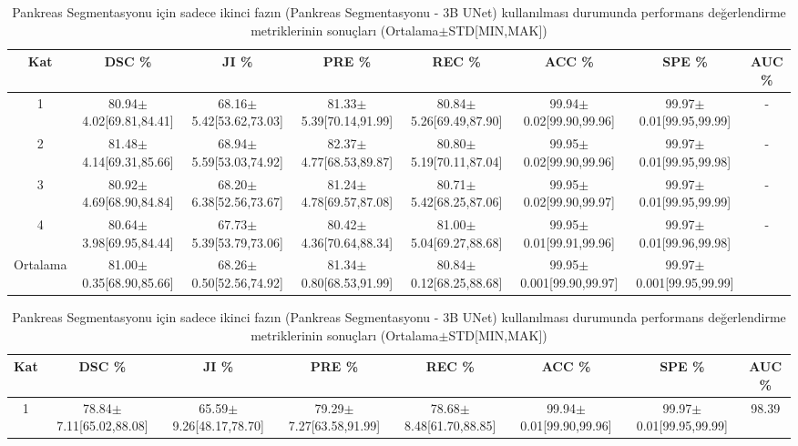 \begin{table}
	\centering
	\caption{Pankreas Segmentasyonu için sadece birinci fazın (Pankreas İlgi Bölgesinin Belirlenmesi - Mask R-CNN) kullanılması durumunda performans değerlendirme metriklerinin sonuçları (Ortalama$\pm$STD[MIN,MAK])}
	\label{tab:mrcnn_result}
	\begin{adjustbox}{width=\textwidth}		
		\begin{tabular}{cccccccc}
			\toprule
			Kat   &  DSC \%       &  JI  \%   &  PRE  \%   &  REC  \%  & ACC  \%  &  SPE  \% &  AUC  \% \\ 
			\midrule 
			1       & 80.94$\pm$4.02[69.81,84.41] & 68.16$\pm$5.42[53.62,73.03] & 81.33$\pm$5.39[70.14,91.99] & 80.84$\pm$5.26[69.49,87.90] & 99.94$\pm$0.02[99.90,99.96]  & 99.97$\pm$0.01[99.95,99.99]  &  - \\
			2       & 81.48$\pm$4.14[69.31,85.66] & 68.94$\pm$5.59[53.03,74.92] & 82.37$\pm$4.77[68.53,89.87] & 80.80$\pm$5.19[70.11,87.04] & 99.95$\pm$0.02[99.90,99.96]  & 99.97$\pm$0.01[99.95,99.98]  &  - \\
			3       & 80.92$\pm$4.69[68.90,84.84] & 68.20$\pm$6.38[52.56,73.67] & 81.24$\pm$4.78[69.57,87.08] & 80.71$\pm$5.42[68.25,87.06] & 99.95$\pm$0.02[99.90,99.97]  & 99.97$\pm$0.01[99.95,99.99]  &  - \\
			4       & 80.64$\pm$3.98[69.95,84.44] & 67.73$\pm$5.39[53.79,73.06] & 80.42$\pm$4.36[70.64,88.34] & 81.00$\pm$5.04[69.27,88.68] & 99.95$\pm$0.01[99.91,99.96]  & 99.97$\pm$0.01[99.96,99.98]  &  - \\
			\toprule
			Ortalama & 81.00$\pm$0.35[68.90,85.66] & 68.26$\pm$0.50[52.56,74.92] & 81.34$\pm$0.80[68.53,91.99] & 80.84$\pm$0.12[68.25,88.68] & 99.95$\pm$0.001[99.90,99.97] & 99.97$\pm$0.001[99.95,99.99] &  \\		
			\bottomrule			
		\end{tabular}
	\end{adjustbox}
	\vspace{2\baselineskip}
	\caption{Pankreas Segmentasyonu için sadece ikinci fazın (Pankreas Segmentasyonu - 3B UNet) kullanılması durumunda performans değerlendirme metriklerinin sonuçları (Ortalama$\pm$STD[MIN,MAK])}
	\label{tab:unet_result}
	\begin{adjustbox}{width=\textwidth}		
		\begin{tabular}{cccccccc}
			\toprule
			Kat   &  DSC \%       &  JI  \%   &  PRE  \%   &  REC  \%  & ACC  \%  &  SPE  \% &  AUC  \% \\ 
			\midrule 
			1       & 78.84$\pm$7.11[65.02,88.08] & 65.59$\pm$9.26[48.17,78.70] & 79.29$\pm$7.27[63.58,91.99] & 78.68$\pm$8.48[61.70,88.85] & 99.94$\pm$0.01[99.90,99.96] & 99.97$\pm$0.01[99.95,99.99] & 98.39      \\

\end{tabular}
\end{adjustbox}
\end{table}
